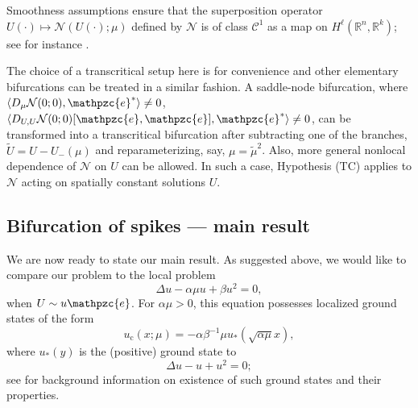 \documentclass[10pt]{article}
\newcommand{\R}{\mathbb{R}}
\newcommand{\Nl}{\mathcal{N}}
\newcommand{\e}{\mathpzc{e}}
\begin{document}
Smoothness assumptions ensure that the superposition operator $U(\cdot) \mapsto \Nl(U(\cdot);\mu)$ defined by $\Nl$ is of class $\mathscr{C}^1$ as a map on $H^\ell(\R^n,\R^k)$; see for instance \cite{runst1996sobolev}.

The choice of a transcritical setup here is for convenience and other elementary bifurcations can be treated in a similar fashion. A saddle-node bifurcation, where  $\langle D_{\mu} \Nl(0;0), {\e}^*\rangle \neq 0$,  $\langle D_{U,U} \Nl(0;0)[{\e},{\e}], {\e}^*\rangle \neq 0$, can be transformed into a transcritical bifurcation after subtracting one of the branches, $\tilde{U}=U-U_-(\mu)$ and reparameterizing, say, $\mu=\tilde{\mu}^2$. Also, more general nonlocal dependence of $\Nl$ on $U$ can be allowed. In such a case, Hypothesis (TC) applies to $\Nl$ acting on spatially constant solutions $U$.


\subsection{Bifurcation of spikes --- main result}\label{s:res}

We are now ready to state our main result. As suggested above, we would like to compare our problem to the local problem 
\begin{equation}\label{e:gs}
\Delta u - \alpha\mu u + \beta u^2=0,
\end{equation}
when $U\sim u{\e}$. For $\alpha\mu>0$, this equation possesses localized ground states of the form 
\begin{equation}\label{e:gs00}
u_\mathrm{c}(x;\mu)=-\alpha\beta^{-1}\mu u_*(\sqrt{\alpha\mu} x),
\end{equation}
where $u_*(y)$ is the (positive) ground state to 
\begin{equation}\label{e:gs0}
\Delta u -  u + u^2=0;
\end{equation}
see \cite{gs} for background information on existence of such ground states and their properties. 
\end{document}
